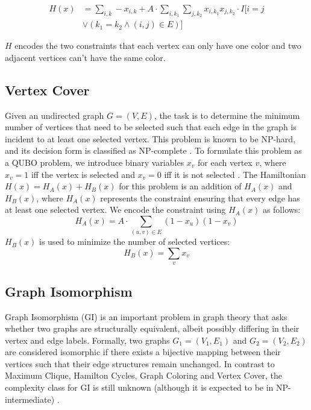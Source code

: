 \documentclass[conference]{IEEEtran}
\theoremstyle{plain}
\theoremstyle{definition}
\theoremstyle{remark}
\begin{document}
\begin{equation*}
\begin{aligned}
    H(x) &= \sum_{i,k} -x_{i,k} + A \cdot \sum_{i,k_1} \sum_{j,k_2} x_{i,k_1} x_{j,k_2} \cdot I[i=j \\ &\lor (k_1 = k_2 \land (i,j) \in E)]
\end{aligned}
\end{equation*}

$H$ encodes the two constraints that each vertex can only have one color and two adjacent vertices can't have the same color.

\subsection{Vertex Cover}

Given an undirected graph $G=(V,E)$, the task is to determine the minimum number of vertices that need to be selected such that each edge in the graph is incident to at least one selected vertex. This problem is known to be NP-hard, and its decision form is classified as NP-complete \cite{karp1975computational}. To formulate this problem as a QUBO problem, we introduce binary variables $x_v$ for each vertex $v$, where $x_v = 1$ iff the vertex is selected and $x_v = 0$ iff it is not selected \cite{lucas2014ising}. The Hamiltonian $H(x) = H_A(x) + H_B(x)$ for this problem is an addition of $H_A(x)$ and $H_B(x)$, where $H_A(x)$ represents the constraint ensuring that every edge has at least one selected vertex. We encode the constraint using $H_A(x)$ as follows:
\[
H_A(x) = A \cdot \sum_{(u,v) \in E} (1 - x_u)(1 - x_v)
\]
$H_B(x)$ is used to minimize the number of selected vertices:
\[
H_B(x) = \sum_v x_v
\]

\subsection{Graph Isomorphism}
Graph Isomorphism (GI) is an important problem in graph theory that asks whether two graphs are structurally equivalent, albeit possibly differing in their vertex and edge labels. Formally, two graphs $G_1=(V_1, E_1)$ and $G_2=(V_2, E_2)$ are considered isomorphic if there exists a bijective mapping between their vertices such that their edge structures remain unchanged. In contrast to Maximum Clique, Hamilton Cycles, Graph Coloring and Vertex Cover, the complexity class for GI is still unknown (although it is expected to be in NP-intermediate) \cite{npintermediate}.
\end{document}
